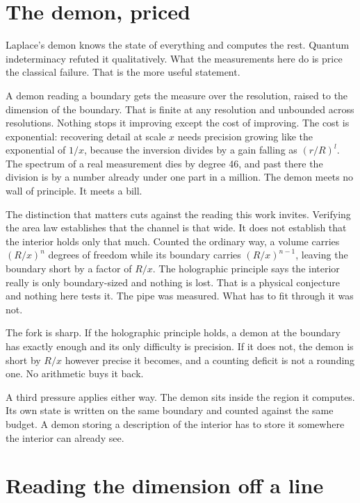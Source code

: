 \section{The demon, priced}

Laplace's demon knows the state of everything and computes the rest. Quantum indeterminacy refuted
it qualitatively. What the measurements here do is price the classical failure. That is the more
useful statement.

A demon reading a boundary gets the measure over the resolution, raised to the dimension of the
boundary. That is finite at any resolution and unbounded across resolutions. Nothing stops it
improving except the cost of improving. The cost is exponential: recovering detail at scale $x$
needs precision growing like the exponential of $1/x$, because the inversion divides by a gain
falling as $(r/R)^l$. The spectrum of a real measurement dies by degree 46, and past there the
division is by a number already under one part in a million. The demon meets no wall of principle.
It meets a bill.

The distinction that matters cuts against the reading this work invites. Verifying the area law
establishes that the channel is that wide. It does not establish that the interior holds only that
much. Counted the ordinary way, a volume carries $(R/x)^n$ degrees of freedom while its boundary
carries $(R/x)^{n-1}$, leaving the boundary short by a factor of $R/x$. The holographic principle says
the interior really is only boundary-sized and nothing is lost. That is a physical conjecture and
nothing here tests it. The pipe was measured. What has to fit through it was not.

The fork is sharp. If the holographic principle holds, a demon at the boundary has exactly enough
and its only difficulty is precision. If it does not, the demon is short by $R/x$ however precise it
becomes, and a counting deficit is not a rounding one. No arithmetic buys it back.

A third pressure applies either way. The demon sits inside the region it computes. Its own state
is written on the same boundary and counted against the same budget. A demon storing a description
of the interior has to store it somewhere the interior can already see.

\section{Reading the dimension off a line}

